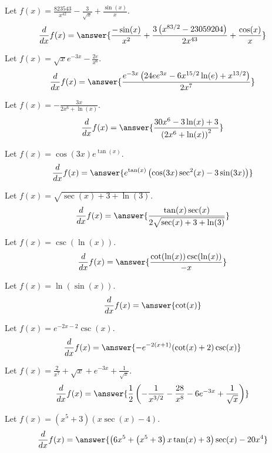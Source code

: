 \documentclass{ximera}
\begin{document}
\begin{shuffle}
\begin{exercise}
Let $f(x)=\frac{823543}{x^{42}}-\frac{3}{\sqrt{x}}+\frac{\sin (x)}{x}$.
\[
\ddx f(x) = \answer{\frac{-\sin (x)}{x^2}+\frac{3 \left(x^{83/2}-23059204\right)}{2 x^{43}}+\frac{\cos (x)}{x}}
\]
\end{exercise}

\begin{exercise}
Let $f(x)=\sqrt{x} e^{-3 x}-\frac{2 e}{x^6}$.
\[
\ddx f(x) = \answer{\frac{e^{-3 x} \left(24 e e^{3 x}-6 x^{15/2} \ln (e)+x^{13/2}\right)}{2 x^7}}
\]
\end{exercise}

\begin{exercise}
Let $f(x)=-\frac{3 x}{2 x^6+\ln (x)}$.
\[
\ddx f(x) = \answer{\frac{30 x^6-3 \ln (x)+3}{\left(2 x^6+\ln (x)\right)^2}}
\]
\end{exercise}

\begin{exercise}
Let $f(x)=\cos (3 x) e^{\tan (x)}$.
\[
\ddx f(x) = \answer{e^{\tan (x)} \left(\cos (3 x) \sec ^2(x)-3 \sin (3 x)\right)}
\]
\end{exercise}

\begin{exercise}
Let $f(x)=\sqrt{\sec (x)+3+\ln (3)}$.
\[
\ddx f(x) = \answer{\frac{\tan (x) \sec (x)}{2 \sqrt{\sec (x)+3+\ln (3)}}}
\]
\end{exercise}

\begin{exercise}
Let $f(x)=\csc (\ln (x))$.
\[
\ddx f(x) = \answer{\frac{\cot (\ln (x)) \csc (\ln (x))}{-x}}
\]
\end{exercise}

\begin{exercise}
Let $f(x)=\ln (\sin (x))$.
\[
\ddx f(x) = \answer{\cot (x)}
\]
\end{exercise}

\begin{exercise}
Let $f(x)=e^{-2 x-2} \csc (x)$.
\[
\ddx f(x) = \answer{-e^{-2 (x+1)} (\cot (x)+2) \csc (x)}
\]
\end{exercise}

\begin{exercise}
Let $f(x)=\frac{2}{x^7}+\sqrt{x}+e^{-3 x}+\frac{1}{\sqrt{x}}$.
\[
\ddx f(x) = \answer{\frac{1}{2} \left(-\frac{1}{x^{3/2}}-\frac{28}{x^8}-6 e^{-3 x}+\frac{1}{\sqrt{x}}\right)}
\]
\end{exercise}

\begin{exercise}
Let $f(x)=\left(x^5+3\right) (x \sec (x)-4)$.
\[
\ddx f(x) = \answer{\left(6 x^5+\left(x^5+3\right) x \tan (x)+3\right) \sec (x)-20 x^4}
\]
\end{exercise}


\end{shuffle}
\end{document}

